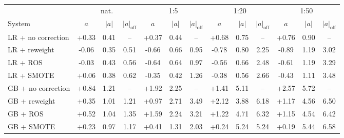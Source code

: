 \begin{tabular}{lcccccccccccc}
\toprule
 & \multicolumn{3}{c}{nat.} & \multicolumn{3}{c}{1:5} & \multicolumn{3}{c}{1:20} & \multicolumn{3}{c}{1:50} \\
System & $a$ & $|a|$ & $|a|_{\text{off}}$ & $a$ & $|a|$ & $|a|_{\text{off}}$ & $a$ & $|a|$ & $|a|_{\text{off}}$ & $a$ & $|a|$ & $|a|_{\text{off}}$ \\
\midrule
LR + no correction & +0.33 & 0.41 & -- & +0.37 & 0.44 & -- & +0.68 & 0.75 & -- & +0.76 & 0.90 & -- \\
LR + reweight & -0.06\rlap{$^{*}$} & 0.35 & 0.51 & -0.66\rlap{$^{*}$} & 0.66 & 0.95 & -0.78\rlap{$^{*}$} & 0.80 & 2.25 & -0.89\rlap{$^{*}$} & 1.19 & 3.02 \\
LR + ROS & -0.03\rlap{$^{*}$} & 0.43 & 0.56 & -0.64\rlap{$^{*}$} & 0.64 & 0.97 & -0.56\rlap{$^{*}$} & 0.66 & 2.48 & -0.61\rlap{$^{*}$} & 1.19 & 3.29 \\
LR + SMOTE & +0.06\rlap{$^{*}$} & 0.38 & 0.62 & -0.35\rlap{$^{*}$} & 0.42 & 1.26 & -0.38\rlap{$^{*}$} & 0.56 & 2.66 & -0.43\rlap{$^{*}$} & 1.11 & 3.48 \\
\midrule
GB + no correction & +0.84 & 1.21 & -- & +1.92 & 2.25 & -- & +1.41 & 5.11 & -- & +2.57 & 5.72 & -- \\
GB + reweight & +0.35\rlap{$^{*}$} & 1.01 & 1.21 & +0.97 & 2.71 & 3.49 & +2.12 & 3.88 & 6.18 & +1.17 & 4.56 & 6.50 \\
GB + ROS & +0.52\rlap{$^{*}$} & 1.04 & 1.35 & +1.59 & 2.24 & 3.21 & +1.22 & 4.71 & 6.32 & +1.15 & 4.54 & 6.42 \\
GB + SMOTE & +0.23\rlap{$^{*}$} & 0.97 & 1.17 & +0.41\rlap{$^{*}$} & 1.31 & 2.03 & +0.24 & 5.24 & 5.24 & +0.19 & 5.44 & 6.58 \\
\bottomrule
\end{tabular}